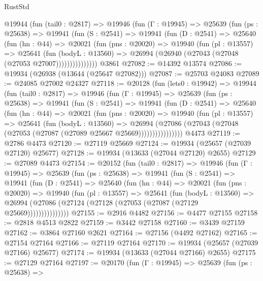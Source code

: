 \begin{lexlean}{RustStd}
\begin{coremodule}
      @19944
        (fun (tail0 : @2817) =>
        @19946
          (fun (Γ : @19945) =>
          @25639
            (fun (ps : @25638) =>
            @19941
              (fun (S : @2541) =>
              @19941
                (fun (D : @2541) =>
                @25640
                  (fun (hn : @44) =>
                  @20021
                    (fun (pns : @20020) =>
                    @19940
                      (fun (pl : @13557) =>
                      @25641
                        (fun (bodyL : @13560) =>
                        @26994 (@26940 (@27043 (@27048 (@27053 @27007)))))))))))))))
    @3861
@27082 := @14392 @13574
@27086 := @19934 (@26938 (@13644 (@25647 @27082)))
@27087 := @25703 @24083
@27089 := @24085 @27002 @24327
@27118 := @20128
    (fun (lets0 : @19942) =>
    @19944
      (fun (tail0 : @2817) =>
      @19946
        (fun (Γ : @19945) =>
        @25639
          (fun (ps : @25638) =>
          @19941
            (fun (S : @2541) =>
            @19941
              (fun (D : @2541) =>
              @25640
                (fun (hn : @44) =>
                @20021
                  (fun (pns : @20020) =>
                  @19940
                    (fun (pl : @13557) =>
                    @25641
                      (fun (bodyL : @13560) =>
                      @26994
                        (@27086
                          (@27043 (@27048 (@27053 (@27087 (@27089 @25667 @25669))))))))))))))))
    @4473
@27119 := @2786 @4473
@27120 := @27119 @25669
@27124 := @19934 (@25657 (@27039 @27120) @25677)
@27128 := @19934 (@13633 (@27044 @27120) @2655)
@27129 := @27089 @4473
@27154 := @20152
    (fun (tail0 : @2817) =>
    @19946
      (fun (Γ : @19945) =>
      @25639
        (fun (ps : @25638) =>
        @19941
          (fun (S : @2541) =>
          @19941
            (fun (D : @2541) =>
            @25640
              (fun (hn : @44) =>
              @20021
                (fun (pns : @20020) =>
                @19940
                  (fun (pl : @13557) =>
                  @25641
                    (fun (bodyL : @13560) =>
                    @26994 (@27086 (@27124 (@27128 (@27053 (@27087 (@27129 @25669)))))))))))))))
@27155 := @2916 @4482
@27156 := @4477 @27155
@27158 := @2818 @4513 @2822
@27159 := @3442 @27158
@27160 := @3439 @27159
@27162 := @3864 @27160 @2621
@27164 := @27156 (@4492 @27162)
@27165 := @27154 @27164
@27166 := @27119 @27164
@27170 := @19934 (@25657 (@27039 @27166) @25677)
@27174 := @19934 (@13633 (@27044 @27166) @2655)
@27175 := @27129 @27164
@27197 := @20170
    (fun (Γ : @19945) =>
    @25639
      (fun (ps : @25638) =>

\end{coremodule}
\end{lexlean}
